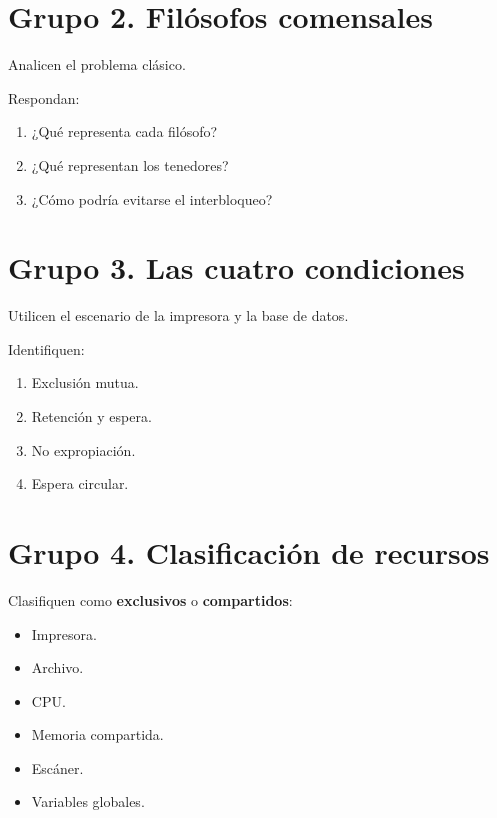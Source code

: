 \documentclass[
  spanish,
  letterpaper,
]{scrbook}
\providecommand{\tightlist}{%
  \setlength{\itemsep}{0pt}\setlength{\parskip}{0pt}}
\begin{document}
\section{Grupo 2. Filósofos
comensales}\label{grupo-2.-filuxf3sofos-comensales}

Analicen el problema clásico.

Respondan:

\begin{enumerate}
\def\labelenumi{\arabic{enumi}.}
\tightlist
\item
  ¿Qué representa cada filósofo?
\item
  ¿Qué representan los tenedores?
\item
  ¿Cómo podría evitarse el interbloqueo?
\end{enumerate}

\section{Grupo 3. Las cuatro
condiciones}\label{grupo-3.-las-cuatro-condiciones}

Utilicen el escenario de la impresora y la base de datos.

Identifiquen:

\begin{enumerate}
\def\labelenumi{\arabic{enumi}.}
\tightlist
\item
  Exclusión mutua.
\item
  Retención y espera.
\item
  No expropiación.
\item
  Espera circular.
\end{enumerate}

\section{Grupo 4. Clasificación de
recursos}\label{grupo-4.-clasificaciuxf3n-de-recursos}

Clasifiquen como \textbf{exclusivos} o \textbf{compartidos}:

\begin{itemize}
\tightlist
\item
  Impresora.
\item
  Archivo.
\item
  CPU.
\item
  Memoria compartida.
\item
  Escáner.
\item
  Variables globales.
\end{itemize}
\end{document}
